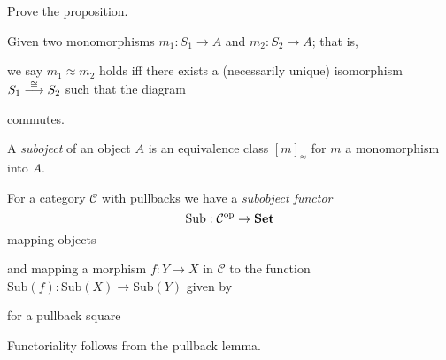\begin{exercise}
	Prove the proposition.
\end{exercise}

\begin{definition}
Given two monomorphisms $m_1: S_1 \to A$ and $m_2: S_2 \to A$; that is,
	\begin{center}
	\end{center}
\end{definition}
we say $m_1 \approx m_2$ holds iff there exists a (necessarily unique)
isomorphism $S_1 \stackrel{\cong}\longrightarrow S_2$ such that the diagram
\begin{center}
\end{center}
commutes.

\begin{definition}[Suboject]
A \emph{suboject} of an object $A$ is an equivalence class $[m]_{\approx}$ for
$m$ a monomorphism into $A$.  
\end{definition}

\begin{definition}
For a category $\mathcal{C}$ with pullbacks we have a 
\emph{subobject functor}
\[
\mathrm{Sub}: \mathcal{C}^{\mathrm{op}} \to  \mathbf {Set} 
\]
mapping objects
\begin{center}
\end{center}
and mapping a morphism $f: Y \to X$ in $\mathcal C$ to the function
$\mathrm{Sub}(f): \mathrm{Sub}(X) \to \mathrm{Sub}(Y)$ given by
\begin{center}
\end{center}
for a pullback square
\begin{center}
\end{center}
\end{definition}
\begin{remark}
Functoriality follows from the pullback lemma.	
\end{remark}

